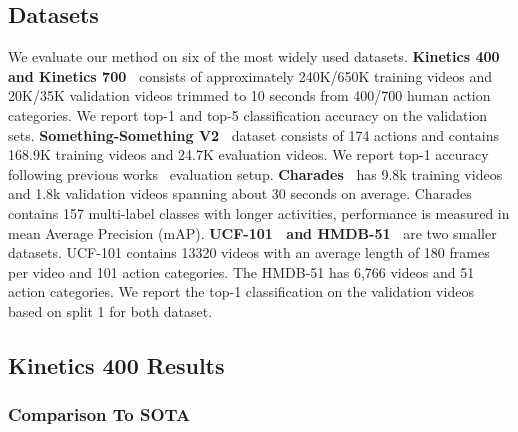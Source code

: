 \documentclass[10pt,twocolumn,letterpaper]{article}
\begin{document}
\subsection{Datasets}
We evaluate our method on six of the most widely used datasets.
\textbf{Kinetics 400~\cite{kay2017kinetics} and Kinetics 700~\cite{carreira2019short}} consists of approximately 240K/650K training videos and 20K/35K validation videos trimmed to 10 seconds from 400/700 human action categories. We report top-1 and top-5 classification accuracy on the validation sets.
\textbf{Something-Something V2~\cite{goyal2017something}} dataset consists of 174 actions and contains 168.9K training videos and 24.7K evaluation videos. We report top-1 accuracy following previous works~\cite{lin2019tsm} evaluation setup. 
\textbf{Charades~\cite{sigurdsson2016hollywood}} has 9.8k training videos and 1.8k validation videos spanning about 30 seconds on average. Charades contains 157 multi-label classes with longer activities, performance is measured in mean Average Precision (mAP).
\textbf{UCF-101~\cite{soomro2012dataset} and HMDB-51~\cite{kuehne2011hmdb}} are two smaller datasets. UCF-101 contains 13320 videos with an average length of 180 frames per video and 101 action categories. The HMDB-51 has 6,766 videos and 51 action categories. We report the top-1 classification on the validation videos based on split 1 for both dataset.

\subsection{Kinetics 400 Results}
\subsubsection{Comparison To SOTA} 
\end{document}
